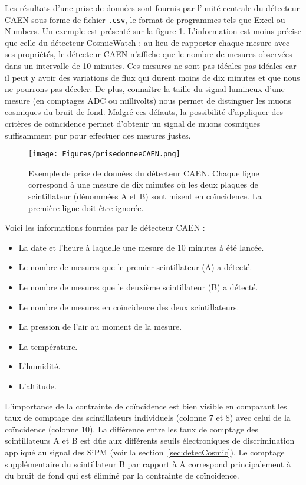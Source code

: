 \documentclass[a4paper, 12pt]{article}
\begin{document}
\begin{spacing}{1.5}
Les résultats d'une prise de données sont fournis par l'unité centrale du détecteur CAEN sous forme de fichier {\tt *.csv}, le format de programmes tels que Excel ou Numbers. Un exemple est présenté sur la figure \ref{fig:PrisedonneeCAEN}. L'information est moins précise que celle du détecteur CosmicWatch : au lieu de rapporter chaque mesure avec ses propriétés, le détecteur CAEN n'affiche que le nombre de mesures observées dans un intervalle de 10 minutes. Ces mesures ne sont pas idéales pas idéales car il peut y avoir des variations de flux qui durent moins de dix minutes et que nous ne pourrons pas déceler. De plus, connaître la taille du signal lumineux d'une mesure (en comptages ADC ou millivolts) nous permet de distinguer les muons cosmiques du bruit de fond. Malgré ces défauts, la possibilité d'appliquer des critères de coïncidence permet d'obtenir un signal de muons cosmiques suffisamment pur pour effectuer des mesures justes.

\begin{figure}[t]
\begin{center}
\texttt{[image: Figures/prisedonneeCAEN.png]}
\caption{\label{fig:PrisedonneeCAEN} Exemple de prise de données du détecteur CAEN. Chaque ligne correspond à une mesure de dix minutes où les deux plaques de scintillateur (dénommées A et B) sont misent en coïncidence. La première ligne doit être ignorée.}
\end{center}
\end{figure}

Voici les informations fournies par le détecteur CAEN :
\begin{itemize}
  \item La date et l'heure à laquelle une mesure de 10 minutes à été lancée.
  \item Le nombre de mesures que le premier scintillateur (A) a détecté.
  \item Le nombre de mesures que le deuxième scintillateur (B) a détecté.
  \item Le nombre de mesures en coïncidence des deux scintillateurs.
  \item La pression de l'air au moment de la mesure.
  \item La température.
  \item L'humidité.
  \item L'altitude.
\end{itemize}
L'importance de la contrainte de coïncidence est bien visible en comparant les taux de comptage des scintillateurs individuels (colonne 7 et 8) avec celui de la coïncidence (colonne 10). La différence entre les taux de comptage des scintillateurs A et B est dûe aux différents seuils électroniques de discrimination appliqué au signal des SiPM (voir la section~\ref{sec:detecCosmic}). Le comptage supplémentaire du scintillateur B par rapport à A correspond principalement à du bruit de fond qui est éliminé par la contrainte de coïncidence.


\end{spacing}
\end{document}
